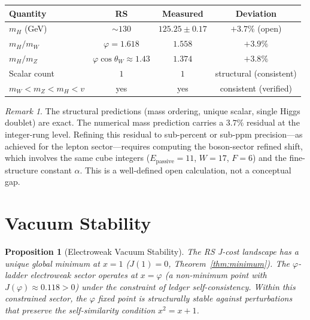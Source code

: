 \documentclass[12pt,a4paper]{article}
\newtheorem{proposition}[theorem]{Proposition}
\theoremstyle{definition}
\theoremstyle{remark}
\newtheorem{remark}[theorem]{Remark}
\begin{document}
\begin{center}
\renewcommand{\arraystretch}{1.3}
\begin{tabular}{lccc}
\toprule
\textbf{Quantity} & \textbf{RS} &
\textbf{Measured} & \textbf{Deviation} \\
\midrule
$m_H$ (GeV) & $\sim 130$ & $125.25 \pm 0.17$ & $+3.7\%$ (open) \\
$m_H/m_W$ & $\varphi = 1.618$ & $1.558$ & $+3.9\%$ \\
$m_H/m_Z$ & $\varphi\cos\theta_W \approx 1.43$ & $1.374$ & $+3.8\%$ \\
Scalar count & $1$ & $1$ & structural (consistent) \\
$m_W < m_Z < m_H < v$ & yes & yes & consistent (verified) \\
\bottomrule
\end{tabular}
\end{center}

\begin{remark}
The structural predictions (mass ordering, unique scalar,
single Higgs doublet) are exact.  The numerical mass prediction
carries a $3.7\%$ residual at the integer-rung level.
Refining this residual to sub-percent or sub-ppm precision---as
achieved for the lepton sector---requires computing the
boson-sector refined shift, which involves the same cube
integers ($E_{\mathrm{passive}} = 11$, $W = 17$, $F = 6$) and
the fine-structure constant $\alpha$.  This is a well-defined
open calculation, not a conceptual gap.
\end{remark}

\section{Vacuum Stability}
\label{sec:stability}

\begin{proposition}[Electroweak Vacuum Stability]
\label{prop:stability}
The RS J-cost landscape has a unique global minimum at $x = 1$
($J(1) = 0$, Theorem~\ref{thm:minimum}).  The $\varphi$-ladder
electroweak sector operates at $x = \varphi$ (a non-minimum point
with $J(\varphi) \approx 0.118 > 0$) under the constraint of
ledger self-consistency.  Within this constrained sector, the
$\varphi$ fixed point is structurally stable against perturbations
that preserve the self-similarity condition $x^2 = x + 1$.
\end{proposition}
\end{document}
